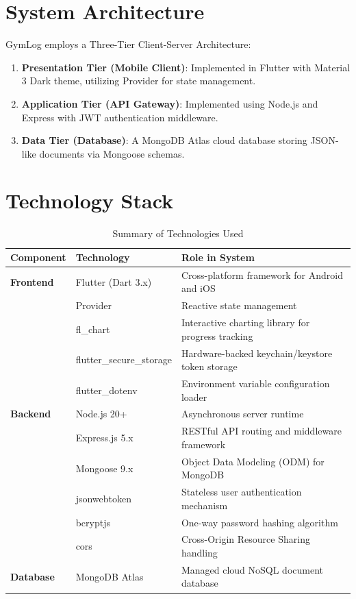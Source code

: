 \documentclass[12pt,a4paper]{article}
\begin{document}
\section{System Architecture}
GymLog employs a Three-Tier Client-Server Architecture:
\begin{enumerate}
    \item \textbf{Presentation Tier (Mobile Client)}: Implemented in Flutter with Material 3 Dark theme, utilizing Provider for state management.
    \item \textbf{Application Tier (API Gateway)}: Implemented using Node.js and Express with JWT authentication middleware.
    \item \textbf{Data Tier (Database)}: A MongoDB Atlas cloud database storing JSON-like documents via Mongoose schemas.
\end{enumerate}

\section{Technology Stack}
\begin{table}[h!]
    \centering
    \caption{Summary of Technologies Used}
    \begin{tabularx}{\textwidth}{l l X}
        \toprule
        \textbf{Component} & \textbf{Technology} & \textbf{Role in System} \\
        \midrule
        \textbf{Frontend} & Flutter (Dart 3.x) & Cross-platform framework for Android and iOS \\
        & Provider & Reactive state management \\
        & fl\_chart & Interactive charting library for progress tracking \\
        & flutter\_secure\_storage & Hardware-backed keychain/keystore token storage \\
        & flutter\_dotenv & Environment variable configuration loader \\
        \midrule
        \textbf{Backend} & Node.js 20+ & Asynchronous server runtime \\
        & Express.js 5.x & RESTful API routing and middleware framework \\
        & Mongoose 9.x & Object Data Modeling (ODM) for MongoDB \\
        & jsonwebtoken & Stateless user authentication mechanism \\
        & bcryptjs & One-way password hashing algorithm \\
        & cors & Cross-Origin Resource Sharing handling \\
        \midrule
        \textbf{Database} & MongoDB Atlas & Managed cloud NoSQL document database \\
        \bottomrule
    \end{tabularx}
\end{table}
\end{document}
